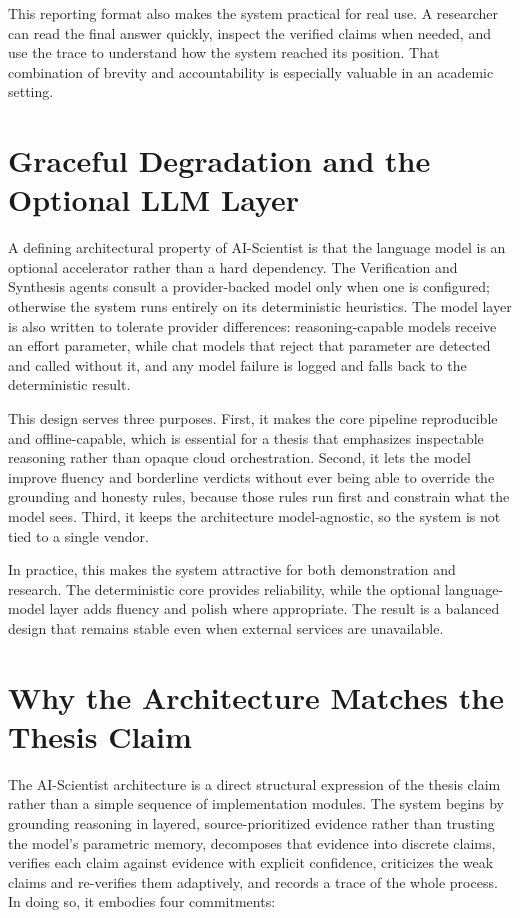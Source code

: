 This reporting format also makes the system practical for real use. A researcher can read the final answer quickly,
inspect the verified claims when needed, and use the trace to understand how the system reached its position.
That combination of brevity and accountability is especially valuable in an academic setting.

\section{Graceful Degradation and the Optional LLM Layer }

A defining architectural property of AI-Scientist is that the language model is an optional accelerator rather than
a hard dependency. The Verification and Synthesis agents consult a provider-backed model only when one is
configured; otherwise the system runs entirely on its deterministic heuristics. The model layer is also written to
tolerate provider differences: reasoning-capable models receive an effort parameter, while chat models that reject
that parameter are detected and called without it, and any model failure is logged and falls back to the
deterministic result.

This design serves three purposes. First, it makes the core pipeline reproducible and offline-capable, which is
essential for a thesis that emphasizes inspectable reasoning rather than opaque cloud orchestration. Second, it
lets the model improve fluency and borderline verdicts without ever being able to override the grounding and
honesty rules, because those rules run first and constrain what the model sees. Third, it keeps the architecture
model-agnostic, so the system is not tied to a single vendor.

In practice, this makes the system attractive for both demonstration and research. The deterministic core provides
reliability, while the optional language-model layer adds fluency and polish where appropriate. The result is a
balanced design that remains stable even when external services are unavailable.

\section{Why the Architecture Matches the Thesis Claim }

The AI-Scientist architecture is a direct structural expression of the thesis claim rather than a simple sequence
of implementation modules. The system begins by grounding reasoning in layered, source-prioritized evidence
rather than trusting the model's parametric memory, decomposes that evidence into discrete claims, verifies each
claim against evidence with explicit confidence, criticizes the weak claims and re-verifies them adaptively, and
records a trace of the whole process. In doing so, it embodies four commitments:

